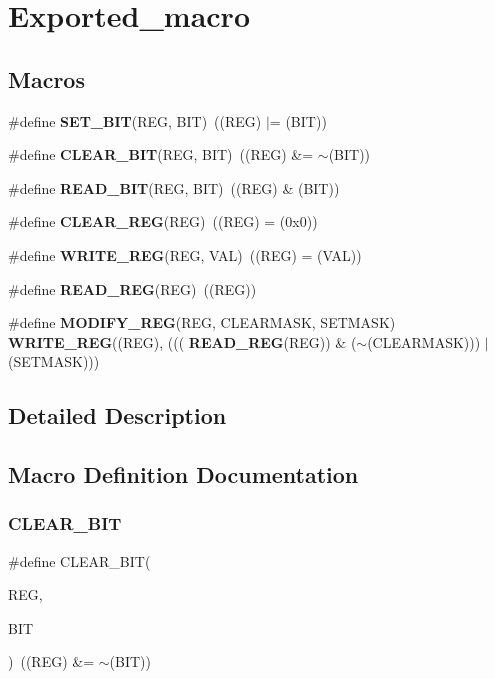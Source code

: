 \section{Exported\+\_\+macro}
\label{group__Exported__macro}
\subsection*{Macros}
\begin{DoxyCompactItemize}
\item 
\#define \textbf{ S\+E\+T\+\_\+\+B\+IT}(R\+EG,  B\+IT)~((R\+EG) $\vert$= (B\+IT))
\item 
\#define \textbf{ C\+L\+E\+A\+R\+\_\+\+B\+IT}(R\+EG,  B\+IT)~((R\+EG) \&= $\sim$(B\+IT))
\item 
\#define \textbf{ R\+E\+A\+D\+\_\+\+B\+IT}(R\+EG,  B\+IT)~((R\+EG) \& (B\+IT))
\item 
\#define \textbf{ C\+L\+E\+A\+R\+\_\+\+R\+EG}(R\+EG)~((R\+EG) = (0x0))
\item 
\#define \textbf{ W\+R\+I\+T\+E\+\_\+\+R\+EG}(R\+EG,  V\+AL)~((R\+EG) = (V\+AL))
\item 
\#define \textbf{ R\+E\+A\+D\+\_\+\+R\+EG}(R\+EG)~((R\+EG))
\item 
\#define \textbf{ M\+O\+D\+I\+F\+Y\+\_\+\+R\+EG}(R\+EG,  C\+L\+E\+A\+R\+M\+A\+SK,  S\+E\+T\+M\+A\+SK)~\textbf{ W\+R\+I\+T\+E\+\_\+\+R\+EG}((R\+EG), (((\textbf{ R\+E\+A\+D\+\_\+\+R\+EG}(R\+EG)) \& ($\sim$(C\+L\+E\+A\+R\+M\+A\+SK))) $\vert$ (S\+E\+T\+M\+A\+SK)))
\end{DoxyCompactItemize}


\subsection{Detailed Description}


\subsection{Macro Definition Documentation}
\mbox{\label{group__Exported__macro_ga133aae6fc0d41bffab39ab223a7001de}} 
\subsubsection{C\+L\+E\+A\+R\+\_\+\+B\+IT}
{\footnotesize\ttfamily \#define C\+L\+E\+A\+R\+\_\+\+B\+IT(\begin{DoxyParamCaption}\item[{}]{R\+EG,  }\item[{}]{B\+IT }\end{DoxyParamCaption})~((R\+EG) \&= $\sim$(B\+IT))}



